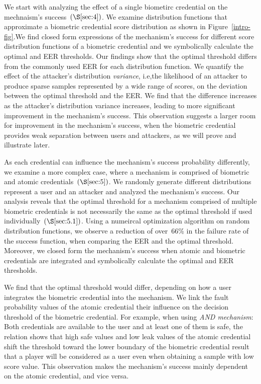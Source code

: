 \documentclass[sigconf]{acmart}
\theoremstyle{definition}
\begin{document}
We start with analyzing the effect of a single biometirc credential on the mechnaism's success~$(\S\ref{sec:4})$. We examine distribution functions that approximate a biometric credential score distribution as shown in Figure~\ref{intro-fig}.We find closed form expressions of the mechanism's success for different score distribution functions of a biometric credential and we symbolically calculate the optimal and EER thresholds. Our findings show that the optimal threshold differs from the commonly used EER for each distribution function. We quantify the effect of the attacker's distribution \emph{variance}, i.e,the likelihood of an attacker to produce sparse samples represented by a wide range of scores, on the deviation between the optimal threshold and the EER. We find that the difference increases as the attacker's distribution variance increases, leading to more significant improvement in the mechanism's success. This observation suggests a larger room for improvement in the mechanism's success, when the biometric credential provides weak separation between users and attackers, as we will prove and illustrate later.

As each credential can influence the mechanism's success probability differently, we examine a more complex case, where a mechanism is comprised of biometric and atomic credentials~$(\S\ref{sec:5})$. We randomly generate different distributions represent a user and an attacker and analyzed the mechanism's success. Our analysis reveals that the optimal threshold for a mechanism comprised of multiple biometric credentials is not necessarily the same as the optimal threshold if used individually~$(\S\ref{sec:5.1})$. Using a numeircal optimization algorithm on random distribution functions, we observe a reduction of over~66\% in the failure rate of the success function, when comparing the EER and the optimal threshold. Moreover, we closed form the mechanism's success when atomic and biometric credentials are integrated and symbolically calculate the optimal and EER thresholds.

We find that the optimal threshold would differ, depending on how a user integrates the biometric credential into the mechanism. We link the fault probability values of the atomic credential their influence on the decision threshold of the biometric credential. For example, when using \emph{AND mechanism}: Both credentials are available to the user and at least one of them is safe, the relation shows that high safe values and low leak values of the atomic credential shift the threshold toward the lower boundary of the biometric credential result that a player will be considered as a user even when obtaining a sample with low score value. This observation makes the mechanism's success mainly dependent on the atomic credential, and vice versa. 
\end{document}
